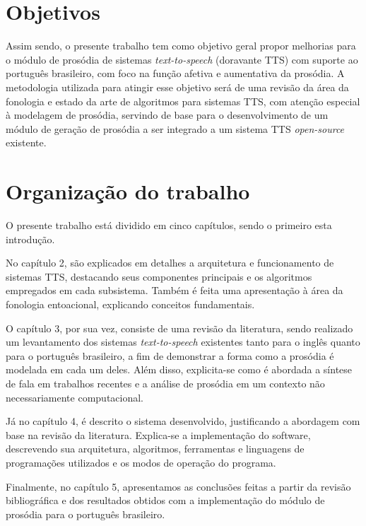\section{Objetivos}
Assim sendo, o presente trabalho tem como objetivo geral propor melhorias para o
módulo de prosódia de sistemas \emph{text-to-speech} (doravante TTS)
com suporte ao português brasileiro, com foco na função afetiva e aumentativa da
prosódia. A metodologia utilizada para atingir esse objetivo será de uma revisão
da área da fonologia e estado da arte de algoritmos para sistemas TTS, com
atenção especial à modelagem de prosódia, servindo de base para o
desenvolvimento de um módulo de geração de prosódia a ser integrado a um sistema
TTS \emph{open-source} existente.

\section{Organização do trabalho}
O presente trabalho está dividido em cinco capítulos, sendo o primeiro esta introdução.

No capítulo 2, são explicados em detalhes a arquitetura e funcionamento de sistemas
TTS, destacando seus componentes principais e os algoritmos empregados em cada
subsistema. Também é feita uma apresentação à área da fonologia entoacional,
explicando conceitos fundamentais.


O capítulo 3, por sua vez, consiste de uma revisão da literatura, sendo
realizado um levantamento dos sistemas \emph{text-to-speech} existentes tanto
para o inglês quanto para o português brasileiro, a fim de demonstrar a forma
como a prosódia é modelada em cada um deles. Além disso, explicita-se como é
abordada a síntese de fala em trabalhos recentes e a análise de prosódia em um
contexto não necessariamente computacional.

Já no capítulo 4, é descrito o sistema desenvolvido, justificando a abordagem com
base na revisão da literatura. Explica-se a implementação do software,
descrevendo sua arquitetura, algoritmos, ferramentas e linguagens de programações
utilizados e os modos de operação do programa.

Finalmente, no capítulo 5, apresentamos as conclusões feitas a partir da revisão
bibliográfica e dos resultados obtidos com a implementação do módulo de prosódia
para o português brasileiro.